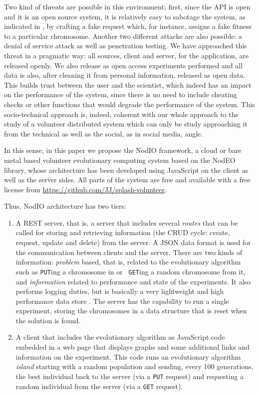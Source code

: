 \documentclass[journal,onecolumn]{IEEEtran}
\begin{document}
Two kind of threats are possible in this environment; first, since the
API is open and it is an open source system, it is relatively easy to
sabotage the system, as indicated in \cite{domingues2007sabotage}, by
crafting a fake request which, for instance, assigns a fake fitness to
a particular chromosome. Another two different attacks are also
possible: a denial of service attack as well as penetration
testing. We have approached this threat in a pragmatic way: all
sources, client and server, for the application, are released
openly. We also release as open access experiments performed
\cite{DBLP:journals/corr/GuervosG15} and all data is also, after
cleaning it from personal information, released as open data. This
builds trust between the user and the scientist, which indeed has an
impact on the performance of the system, since there is no need to
include cheating checks or other functions that would degrade the
performance of the system. This socio-technical approach is, indeed,
coherent with our whole approach to the study of a volunteer
distributed system which can only be study approaching it from the
technical as well as the social, as in social media, angle. 

In this sense, in this paper we propose the {\sf NodIO} framework, a
cloud or bare metal based volunteer evolutionary computing system
based on the {\sf NodEO} library, whose architecture has been
developed using JavaScript on the client as well as the server sides.
All parts of the system are free and available with a free license
from \url{https://github.com/JJ/splash-volunteer}.



Thus, {\sf NodIO} architecture has two tiers:\begin{enumerate}
\item A REST server, that is, a server that includes several {\em
  routes} 
  that can be called for storing and retrieving information (the CRUD cycle:
  create, request, update and delete) from the server. 
  A JSON data format is used for the communication between 
  clients and the server. There are two kinds of information:
  {\em problem} based, that is, related to the
  evolutionary algorithm such as {\tt PUT}ing a chromosome in or {\tt
  GET}ing a random chromosome from it, and {\em information} related
  to performance and state of the experiments. It also performs logging
  duties, but is basically a very lightweight and high performance
  data store \cite{jj:idc:lowcost}.
  The server has the capability to
  run a single experiment, storing the chromosomes in a data structure
  that is reset when the solution is found.
\item A client that includes the evolutionary algorithm as
  JavaScript code embedded in a web page that displays graphs and some
  additional links and information on the experiment. This code runs
  an evolutionary algorithm {\em island} starting with a random
  population and sending, every 100 generations, the best individual
  back to the server (via a {\tt PUT} request) and requesting a random
  individual from the server (via a {\tt GET} request).
\end{enumerate}
\end{document}
